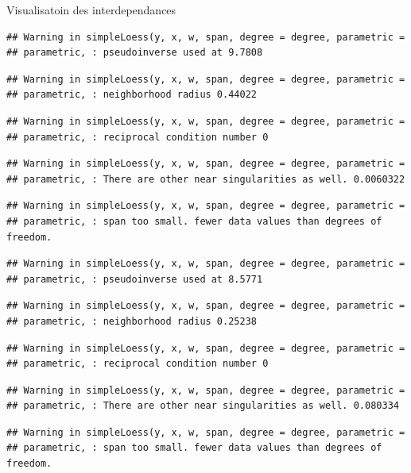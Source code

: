 \documentclass[11pt,ignorenonframetext,]{beamer}
\begin{document}
\begin{frame}[fragile]{Visualisatoin des interdependances}
\begin{verbatim}
## Warning in simpleLoess(y, x, w, span, degree = degree, parametric =
## parametric, : pseudoinverse used at 9.7808
\end{verbatim}

\begin{verbatim}
## Warning in simpleLoess(y, x, w, span, degree = degree, parametric =
## parametric, : neighborhood radius 0.44022
\end{verbatim}

\begin{verbatim}
## Warning in simpleLoess(y, x, w, span, degree = degree, parametric =
## parametric, : reciprocal condition number 0
\end{verbatim}

\begin{verbatim}
## Warning in simpleLoess(y, x, w, span, degree = degree, parametric =
## parametric, : There are other near singularities as well. 0.0060322
\end{verbatim}

\begin{verbatim}
## Warning in simpleLoess(y, x, w, span, degree = degree, parametric =
## parametric, : span too small. fewer data values than degrees of freedom.
\end{verbatim}

\begin{verbatim}
## Warning in simpleLoess(y, x, w, span, degree = degree, parametric =
## parametric, : pseudoinverse used at 8.5771
\end{verbatim}

\begin{verbatim}
## Warning in simpleLoess(y, x, w, span, degree = degree, parametric =
## parametric, : neighborhood radius 0.25238
\end{verbatim}

\begin{verbatim}
## Warning in simpleLoess(y, x, w, span, degree = degree, parametric =
## parametric, : reciprocal condition number 0
\end{verbatim}

\begin{verbatim}
## Warning in simpleLoess(y, x, w, span, degree = degree, parametric =
## parametric, : There are other near singularities as well. 0.080334
\end{verbatim}

\begin{verbatim}
## Warning in simpleLoess(y, x, w, span, degree = degree, parametric =
## parametric, : span too small. fewer data values than degrees of freedom.
\end{verbatim}


\end{frame}
\end{document}
